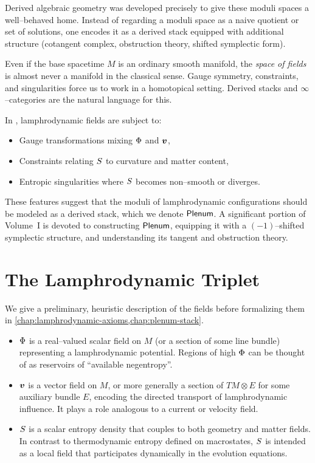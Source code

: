 Derived algebraic geometry was developed precisely to give these moduli spaces
a well--behaved home. Instead of regarding a moduli space as a naive quotient
or set of solutions, one encodes it as a derived stack equipped with additional
structure (cotangent complex, obstruction theory, shifted symplectic form).

\Intuition
Even if the base spacetime $M$ is an ordinary smooth manifold, the \emph{space
of fields} is almost never a manifold in the classical sense. Gauge symmetry,
constraints, and singularities force us to work in a homotopical setting.
Derived stacks and $\infty$--categories are the natural language for this.

In \rsvpabbr{}, lamphrodynamic fields are subject to:
\begin{itemize}
  \item Gauge transformations mixing $\Phi$ and $\bm{v}$,
  \item Constraints relating $S$ to curvature and matter content,
  \item Entropic singularities where $S$ becomes non--smooth or diverges.
\end{itemize}
These features suggest that the moduli of lamphrodynamic configurations should
be modeled as a derived stack, which we denote $\mathsf{Plenum}$. A significant portion
of Volume~I is devoted to constructing $\mathsf{Plenum}$, equipping it with a
$(-1)$--shifted symplectic structure, and understanding its tangent and
obstruction theory.

\section{The Lamphrodynamic Triplet}

We give a preliminary, heuristic description of the fields before formalizing
them in \cref{chap:lamphrodynamic-axioms,chap:plenum-stack}.

\begin{itemize}
  \item $\Phi$ is a real--valued scalar field on $M$ (or a section of
  some line bundle) representing a lamphrodynamic potential. Regions of high
  $\Phi$ can be thought of as reservoirs of ``available negentropy''.

  \item $\bm{v}$ is a vector field on $M$, or more generally a section of
  $TM\otimes E$ for some auxiliary bundle $E$, encoding the directed transport
  of lamphrodynamic influence. It plays a role analogous to a current or
  velocity field.

  \item $S$ is a scalar entropy density that couples to both geometry and
  matter fields. In contrast to thermodynamic entropy defined on macrostates,
  $S$ is intended as a local field that participates dynamically in the
  evolution equations.
\end{itemize}


